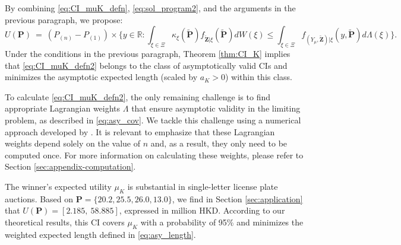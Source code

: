 By combining \eqref{eq:CI_muK_defn}, \eqref{eq:sol_program2}, and the arguments in the previous paragraph, we propose:
\begin{equation}
U(\mathbf{P}) ~=~ ( P_{(n)}-P_{(1)}) \times \bigg\{ y \in \mathbb{R} : \int_{\xi \in \Xi} \kappa_{\xi}(\mathbf{\tilde{P}}) f_{\tilde{\mathbf{Z}}|\xi}(\mathbf{\tilde{P}}) dW(\xi) \leq \int_{\xi \in \Xi} f_{(Y_{\mu},\tilde{\mathbf{Z}})|\xi}(y,\mathbf{\tilde{P}}) d\Lambda(\xi) \bigg\}. \label{eq:CI_muK_defn2}
\end{equation}
Under the conditions in the previous paragraph, Theorem \ref{thm:CI_K} implies that \eqref{eq:CI_muK_defn2} belongs to the class of asymptotically valid CIs and minimizes the asymptotic expected length (scaled by $a_K>0$) within this class.

To calculate \eqref{eq:CI_muK_defn2}, the only remaining challenge is to find appropriate Lagrangian weights $\Lambda$ that ensure asymptotic validity in the limiting problem, as described in \eqref{eq:asy_cov}. We tackle this challenge using a numerical approach developed by \citet{elliott2015}. It is relevant to emphasize that these Lagrangian weights depend solely on the value of $n$ and, as a result, they only need to be computed once. 
For more information on calculating these weights, please refer to Section \ref{sec:appendix-computation}.

\begin{runningexamplecont}
    The winner's expected utility $\mu_K$ is substantial in single-letter license plate auctions. Based on $\mathbf{P}=\{20.2, 25.5, 26.0, 13.0\}$, we find in Section \ref{sec:application} that $U(\mathbf{P})=[2.185,~58.885]$, expressed in million HKD. According to our theoretical results, this CI covers $\mu_K$ with a probability of 95\% and minimizes the weighted expected length defined in \eqref{eq:asy_length}.
\end{runningexamplecont}

